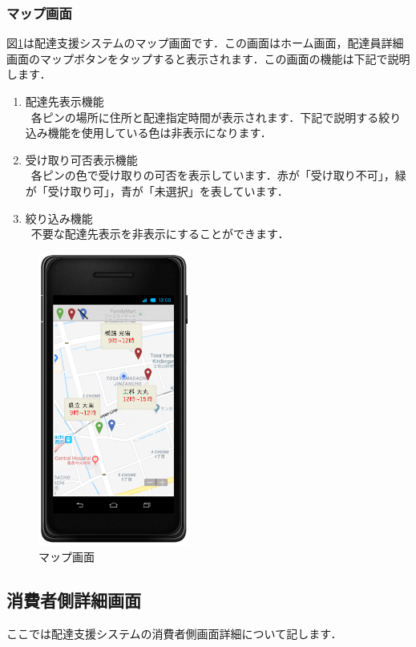 \documentclass[a4j,titlepage]{jarticle}
\begin{document}
\newpage
\subsubsection{マップ画面}
図\ref{fig:map}は配達支援システムのマップ画面です．この画面はホーム画面，配達員詳細画面のマップボタンをタップすると表示されます．この画面の機能は下記で説明します．
\begin{enumerate}
	\item 配達先表示機能\\
	 \ 各ピンの場所に住所と配達指定時間が表示されます．下記で説明する絞り込み機能を使用している色は非表示になります．
	\item 受け取り可否表示機能\\
	 \ 各ピンの色で受け取りの可否を表示しています．赤が「受け取り不可」，緑が「受け取り可」，青が「未選択」を表しています．
	\item 絞り込み機能\\
   \ 不要な配達先表示を非表示にすることができます．

\end{enumerate}

\begin{figure}[H]
 \begin{center}
  \includegraphics[width=50mm]{map.png}
	\caption{マップ画面}
	\label{fig:map}
 \end{center}

\end{figure}

\newpage

\subsection{消費者側詳細画面}
ここでは配達支援システムの消費者側画面詳細について記します．
\end{document}
